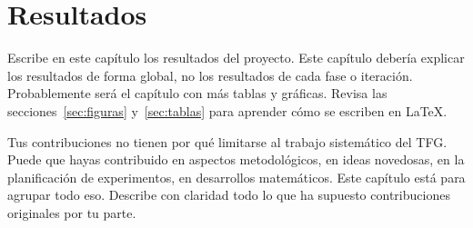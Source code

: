 \chapter{Resultados}
\label{ch:resultados}

\avisoLocalizacionArchivo 

Escribe en este capítulo los resultados del proyecto.  Este capítulo debería explicar los resultados de forma global, no los resultados de cada fase o iteración.  Probablemente será el capítulo con más tablas y gráficas.  Revisa las secciones~\ref{sec:figuras} y~\ref{sec:tablas} para aprender cómo se escriben en \LaTeX{}.

Tus contribuciones no tienen por qué limitarse al trabajo sistemático del TFG.  Puede que hayas contribuido en aspectos metodológicos, en ideas novedosas, en la planificación de experimentos, en desarrollos matemáticos. Este capítulo está para agrupar todo eso.  Describe con claridad todo lo que ha supuesto contribuciones originales por tu parte.

